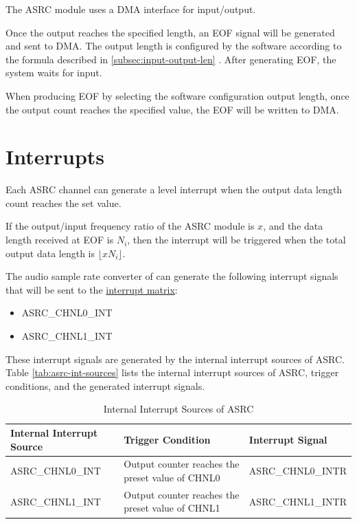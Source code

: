 \documentclass[main\_\_EN.tex]{subfiles}
\begin{document}
The ASRC module uses a DMA interface for input/output.

Once the output reaches the specified length, an EOF signal will be generated and sent to DMA. The output length is configured by the software according to the formula described in \ref{subsec:input-output-len} \textit{}. After generating EOF, the system waits for input.

When producing EOF by selecting the software configuration output length, once the output count reaches the specified value, the EOF will be written to DMA.



\section{Interrupts}

Each ASRC channel can generate a level interrupt when the output data length count reaches the set value.

If the output/input frequency ratio of the ASRC module is $x$, and the data length received at EOF is $N_i$, then the interrupt will be triggered when the total output data length is $\lfloor xN_i\rfloor$.

The audio sample rate converter of \chipname{} can generate the following interrupt signals that will be sent to the \hyperref[mod:intmtrx]{interrupt matrix}:

    \begin{itemize}
        \item ASRC\_CHNL0\_INT
        \item ASRC\_CHNL1\_INT
    \end{itemize}

These interrupt signals are generated by the internal interrupt sources of ASRC. Table \ref{tab:asrc-int-sources} lists the internal interrupt sources of ASRC, trigger conditions, and the generated interrupt signals.

\begin{longtable}{ | L{5cm} | L{6.5cm} | L{4cm} | }
\caption{Internal Interrupt Sources of ASRC} \label{tab:asrc-int-sources}
\\ \hline
{}
\textbf{Internal Interrupt Source} & \textbf{Trigger Condition}  &  \textbf{Interrupt Signal}\\ \hline
\label{int:ASRCCHNL0INT}ASRC\_CHNL0\_INT &  Output counter reaches the preset value of CHNL0 &  ASRC\_CHNL0\_INTR  \\ \hline
\label{int:ASRCCHNL1INT}ASRC\_CHNL1\_INT &  Output counter reaches the preset value of CHNL1 & ASRC\_CHNL1\_INTR \\ \hline
\end{longtable}
\end{document}
